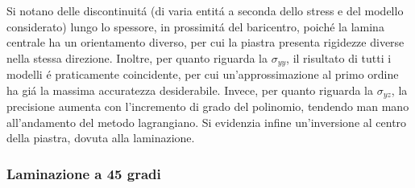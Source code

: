 \documentclass{article}
\begin{document}
            Si notano delle discontinuitá (di varia entitá a seconda dello stress e del modello considerato) lungo lo spessore,
            in prossimitá del baricentro, poiché la lamina centrale ha un orientamento diverso, per cui la piastra presenta rigidezze
            diverse nella stessa direzione. Inoltre, per quanto riguarda la $\sigma_{yy}$, il risultato di tutti i modelli
            é praticamente coincidente, per cui un'approssimazione al primo ordine ha giá la massima accuratezza desiderabile.
            Invece, per quanto riguarda la $\sigma_{yz}$, la precisione aumenta con l'incremento di grado del polinomio, tendendo
            man mano all'andamento del metodo lagrangiano. Si evidenzia infine un'inversione al centro della piastra,
            dovuta alla laminazione.

            \clearpage 

            \subsubsection{Laminazione a 45 gradi\label{statica_stress_45}}
\end{document}
